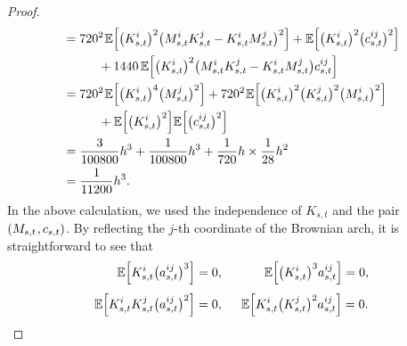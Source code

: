 \documentclass[sn-mathphys-num]{sn-jnl}%
\newcommand{\E}{\mathbb{E}}
\newcommand{\m}{\hspace{0.25mm}}
\newcommand{\mmm}{\hspace{10mm}}
\begin{document}
\begin{proof}
\begin{align*}
& = 720^2\m\E\Big[\big(K_{s,t}^i\big)^2\big(M_{s,t}^i K_{s,t}^j - K_{s,t}^i M_{s,t}^j\big)^2\Big] + \E\Big[\big(K_{s,t}^i\big)^2\big(c_{s,t}^{ij}\big)^2\Big]\\
&\mmm + 1440\,\E\Big[\big(K_{s,t}^i\big)^2\big(M_{s,t}^i K_{s,t}^j - K_{s,t}^i M_{s,t}^j\big)c_{s,t}^{ij}\Big]\\
& = 720^2\m\E\Big[\big(K_{s,t}^i\big)^4 \big(M_{s,t}^j\big)^2\Big] + 720^2\m\E\Big[\big(K_{s,t}^i\big)^2 \big(K_{s,t}^j\big)^2\big(M_{s,t}^i\big)^2\Big]\\
&\mmm + \E\Big[\big(K_{s,t}^i\big)^2\Big]\E\Big[\big(c_{s,t}^{ij}\big)^2\Big]\\
& = \frac{3}{100800}h^3 + \frac{1}{100800}h^3 + \frac{1}{720}h \times \frac{1}{28}h^2\\
& = \frac{1}{11200}h^3.
\end{align*}
In the above calculation, we used the independence of $K_{s,t}$ and the pair $(M_{s,t}\m, c_{s,t})$. By reflecting the $j$-th coordinate of the Brownian arch, it is straightforward to see that
\begin{align*}
\E\Big[K_{s,t}^i \big(a_{s,t}^{ij}\big)^3\Big] & = 0,\hspace{11.5mm} \E\Big[\big(K_{s,t}^i\big)^3 a_{s,t}^{ij}\Big] = 0,\\[3pt]
\E\Big[K_{s,t}^i K_{s,t}^j\big(a_{s,t}^{ij}\big)^2\Big] & = 0, \hspace{5mm} \E\Big[K_{s,t}^i\big(K_{s,t}^j\big)^2 a_{s,t}^{ij}\Big]  = 0.
\end{align*}


\end{proof}
\end{document}

